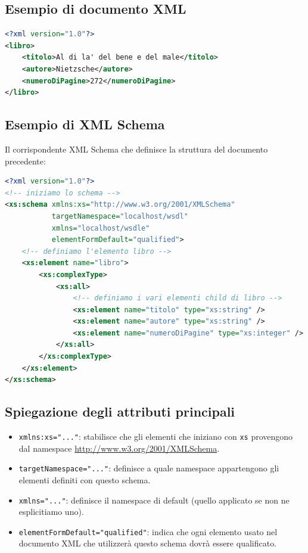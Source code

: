 \subsection{Esempio di documento XML}

\begin{lstlisting}[language=XML]
<?xml version="1.0"?>
<libro>
    <titolo>Al di la' del bene e del male</titolo>
    <autore>Nietzsche</autore>
    <numeroDiPagine>272</numeroDiPagine>
</libro>
\end{lstlisting}

\subsection{Esempio di XML Schema}

Il corrispondente XML Schema che definisce la struttura del documento precedente:

\begin{lstlisting}[language=XML]
<?xml version="1.0"?>
<!-- iniziamo lo schema -->
<xs:schema xmlns:xs="http://www.w3.org/2001/XMLSchema"
           targetNamespace="localhost/wsdl"
           xmlns="localhost/wsdle"
           elementFormDefault="qualified">
    <!-- definiamo l'elemento libro -->
    <xs:element name="libro">
        <xs:complexType>
            <xs:all>
                <!-- definiamo i vari elementi child di libro -->
                <xs:element name="titolo" type="xs:string" />
                <xs:element name="autore" type="xs:string" />
                <xs:element name="numeroDiPagine" type="xs:integer" />
            </xs:all>
        </xs:complexType>
    </xs:element>
</xs:schema>
\end{lstlisting}

\subsection{Spiegazione degli attributi principali}

\begin{itemize}
    \item \texttt{xmlns:xs="..."}: stabilisce che gli elementi che iniziano con \texttt{xs} provengono dal namespace \url{http://www.w3.org/2001/XMLSchema}.
    \item \texttt{targetNamespace="..."}: definisce a quale namespace appartengono gli elementi definiti con questo schema.
    \item \texttt{xmlns="..."}: definisce il namespace di default (quello applicato se non ne esplicitiamo uno).
    \item \texttt{elementFormDefault="qualified"}: indica che ogni elemento usato nel documento XML che utilizzerà questo schema dovrà essere qualificato.
\end{itemize}

